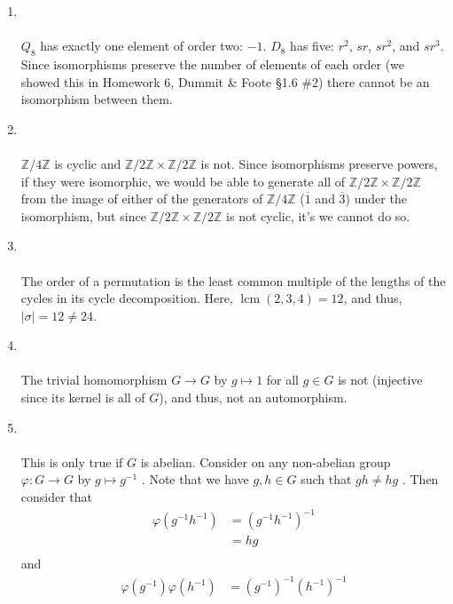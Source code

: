\documentclass[12 pt, letterpaper]{hmcpset}
\begin{document}
\begin{solution}
	\begin{enumerate}
		\item {} \\\\
			$Q_{8}$ has exactly one element of order two: $-1$. $D_{8}$ has five: $r^{2}$, $sr$, $sr^{2}$, and $sr^{3}$. Since isomorphisms preserve the number of elements of each order (we showed this in Homework 6, Dummit \& Foote \S1.6 \#2) there cannot be an isomorphism between them.
		\item {} \\\\
			$\mathbb{Z}/4\mathbb{Z}$ is cyclic and $\mathbb{Z}/2\mathbb{Z} \times \mathbb{Z}/2\mathbb{Z}$ is not. Since isomorphisms preserve powers, if they were isomorphic, we would be able to generate all of $\mathbb{Z}/2\mathbb{Z} \times \mathbb{Z}/2\mathbb{Z}$ from the image of either of the generators of $\mathbb{Z}/4\mathbb{Z}$ ($\overline{1}$ and $\overline{3}$) under the isomorphism, but since $\mathbb{Z}/2\mathbb{Z} \times \mathbb{Z}/2\mathbb{Z}$ is not cyclic, it's we cannot do so.
		\item {} \\\\
			The order of a permutation is the least common multiple of the lengths of the cycles in its cycle decomposition. Here, $\operatorname{lcm} (2, 3, 4) = 12$, and thus, $\vert \sigma \vert = 12 \neq 24$.
		\item {} \\\\
			The trivial homomorphism $G \to G$ by $g \mapsto 1$ for all $g \in G$ is not (injective since its kernel is all of $G$), and thus, not an automorphism.
		\item {} \\\\
			This is only true if $G$ is abelian. Consider on any non-abelian group  $\varphi : G \to G$  by $g \mapsto g^{-1}$ . Note that we have $g, h \in G$  such that $g h \neq h g$ . Then consider that
			\[
				\begin{split}
					\varphi(g^{-1} h^{-1}) & = (g^{-1} h^{-1})^{-1} \\
							       & = hg \\
				\end{split}
			\]
			and
			\[
				\begin{split}
					\varphi(g^{-1}) \varphi(h^{-1}) & = (g^{-1})^{-1} (h^{-1})^{-1} \\

\end{split}\]
\end{enumerate}
\end{solution}
\end{document}
